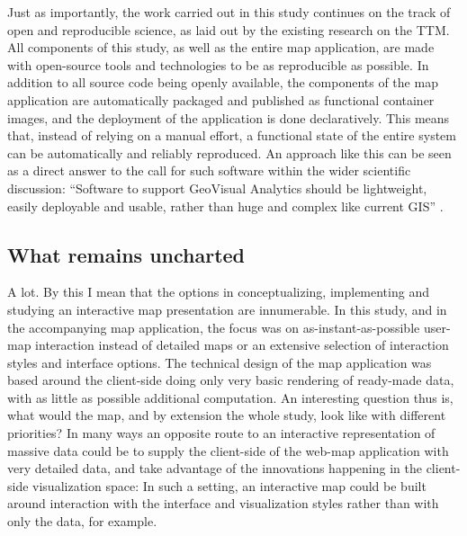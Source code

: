 Just as importantly,
the work carried out in this study continues on the track of open and reproducible science,
as laid out by the existing research on the TTM.
All components of this study, as well as the entire map application, are made
with open-source tools and technologies to be as reproducible as possible.
In addition to all source code being openly available,
the components of the map application are
automatically packaged and published as functional container images,
and the deployment of the application is done declaratively.
This means that, instead of relying on a manual effort,
a functional state of the entire system can be automatically and reliably reproduced.
An approach like this can be seen as a direct answer to the call for such software
within the wider scientific discussion:
\enquote{Software to support GeoVisual Analytics should be lightweight,
easily deployable and usable, rather than huge and complex like current GIS}
\parencite[p.~1596]{and2010}.


\subsection{What remains uncharted}

A lot. By this I mean that the options in
conceptualizing, implementing and studying an interactive map presentation are innumerable.
In this study, and in the accompanying map application,
the focus was on as-instant-as-possible user-map interaction instead of
detailed maps or an extensive selection of interaction styles and interface options.
The technical design of the map application
was based around the client-side doing only very basic rendering of ready-made data,
with as little as possible additional computation.
An interesting question thus is,
what would the map, and by extension the whole study, look like with different priorities?
In many ways an opposite route to an interactive representation of massive data could be
to supply the client-side of the web-map application with very detailed data,
and take advantage of the innovations happening in the client-side visualization space:
In such a setting, an interactive map could be built around
interaction with the interface and visualization styles rather than with only the data,
for example.

